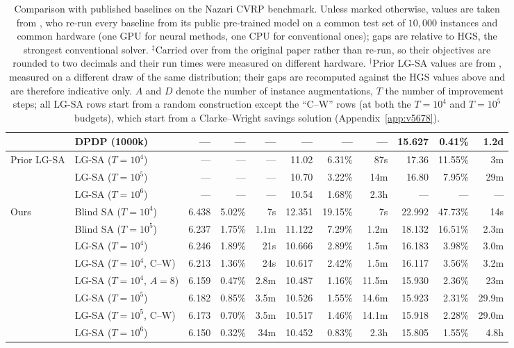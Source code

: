 \documentclass[letterpaper]{article} %
\begin{document}
\begin{table}[t]
\begin{tabular}{@{}ll rrr rrr rrr@{}}
 & DPDP (1000k)                   & ---   & ---    & --- & ---    & ---    & ---  & 15.627 & 0.41\% & 1.2d \\
\midrule
\multirow{3}{*}{Prior LG-SA}
 & LG-SA ($T{=}10^{4}$)           & --- & --- & --- & 11.02 & 6.31\%\rlap{$^{\dagger}$} & 87s  & 17.36 & 11.55\%\rlap{$^{\dagger}$} & 3m \\
 & LG-SA ($T{=}10^{5}$)           & --- & --- & --- & 10.70 & 3.22\%\rlap{$^{\dagger}$} & 14m  & 16.80 & 7.95\%\rlap{$^{\dagger}$}  & 29m \\
 & LG-SA ($T{=}10^{6}$)           & --- & --- & --- & 10.54 & 1.68\%\rlap{$^{\dagger}$} & 2.3h & ---   & ---     & --- \\
\midrule
\multirow{8}{*}{Ours}
 & Blind SA ($T{=}10^{4}$)        & 6.438 & 5.02\% & 7s    & 12.351 & 19.15\% & 7s    & 22.992 & 47.73\% & 14s \\
 & Blind SA ($T{=}10^{5}$)        & 6.237 & 1.75\% & 1.1m  & 11.122 & 7.29\%  & 1.2m  & 18.132 & 16.51\% & 2.3m \\
 & LG-SA ($T{=}10^{4}$)           & 6.246 & 1.89\% & 21s   & 10.666 & 2.89\%  & 1.5m  & 16.183 & 3.98\%  & 3.0m \\
 & LG-SA ($T{=}10^{4}$, C--W)     & 6.213 & 1.36\% & 24s   & 10.617 & 2.42\%  & 1.5m  & 16.117 & 3.56\%  & 3.2m \\
 & LG-SA ($T{=}10^{4}$, $A{=}8$)  & 6.159 & 0.47\% & 2.8m  & 10.487 & 1.16\%  & 11.5m & 15.930 & 2.36\%  & 23m \\
 & LG-SA ($T{=}10^{5}$)           & 6.182 & 0.85\% & 3.5m  & 10.526 & 1.55\%  & 14.6m & 15.923 & 2.31\%  & 29.9m \\
 & LG-SA ($T{=}10^{5}$, C--W)     & 6.173 & 0.70\% & 3.5m  & 10.517 & 1.46\%  & 14.1m & 15.918 & 2.28\%  & 29.0m \\
 & LG-SA ($T{=}10^{6}$)           & 6.150 & 0.32\% & 34m   & 10.452 & 0.83\%  & 2.3h  & 15.805 & 1.55\%  & 4.8h \\
\bottomrule
\end{tabular}
\caption{Comparison with published baselines on the Nazari CVRP benchmark. Unless marked otherwise, values are taken from \citet{ma_learning_2023}, who re-run every baseline from its public pre-trained model on a common test set of $10{,}000$ instances and common hardware (one GPU for neural methods, one CPU for conventional ones); gaps are relative to HGS, the strongest conventional solver. $^{\ddagger}$Carried over from the original paper rather than re-run, so their objectives are rounded to two decimals and their run times were measured on different hardware. $^{\dagger}$Prior LG-SA values are from \citet{AndrettiEtAl26}, measured on a different draw of the same distribution; their gaps are recomputed against the HGS values above and are therefore indicative only. $A$ and $D$ denote the number of instance augmentations, $T$ the number of improvement steps; all LG-SA rows start from a random construction except the ``C--W'' rows (at both the $T{=}10^{4}$ and $T{=}10^{5}$ budgets), which start from a Clarke--Wright savings solution (Appendix~\ref{app:v5678}).}
\label{tab:nazari}
\end{table}
\end{document}
